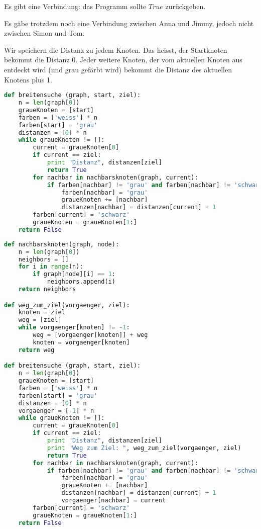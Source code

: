 \begin{lsg}
Es gibt eine Verbindung: das Programm sollte $True$ zur\"uckgeben.
\end{lsg}

\begin{lsg}
Es g\"abe trotzdem noch eine Verbindung zwischen Anna und Jimmy, jedoch nicht zwischen Simon und Tom.
\end{lsg}

\begin{lsg}
Wir speichern die Distanz zu jedem Knoten. Das heisst, der Startknoten bekommt die Distanz 0. Jeder weitere Knoten, der vom aktuellen Knoten aus entdeckt wird (und grau gef\"arbt wird) bekommt die Distanz des aktuellen Knotens plus 1.
\end{lsg}

\begin{lsg}
\hfill
\begin{lstlisting}[language=Python,basicstyle=\small,tabsize=3]
def breitensuche (graph, start, ziel):
	n = len(graph[0])
	graueKnoten = [start]
	farben = ['weiss'] * n
	farben[start] = 'grau'
	distanzen = [0] * n
	while graueKnoten != []:
		current = graueKnoten[0]
		if current == ziel:
			print "Distanz", distanzen[ziel]
			return True
		for nachbar in nachbarsknoten(graph, current):
			if farben[nachbar] != 'grau' and farben[nachbar] != 'schwarz':
				farben[nachbar] = 'grau'
				graueKnoten += [nachbar]
				distanzen[nachbar] = distanzen[current] + 1
		farben[current] = 'schwarz'
		graueKnoten = graueKnoten[1:]
	return False
\end{lstlisting}
\end{lsg}

\begin{lsg}
\hfill
\begin{lstlisting}[language=Python,basicstyle=\small,tabsize=3]
def nachbarsknoten(graph, node):
	n = len(graph[0])
	neighbors = []
	for i in range(n):
		if graph[node][i] == 1:
			neighbors.append(i)
	return neighbors

def weg_zum_ziel(vorgaenger, ziel):
	knoten = ziel
	weg = [ziel]	
	while vorgaenger[knoten] != -1:
		weg = [vorgaenger[knoten]] + weg
		knoten = vorgaenger[knoten]
	return weg

def breitensuche (graph, start, ziel):
	n = len(graph[0])
	graueKnoten = [start]
	farben = ['weiss'] * n
	farben[start] = 'grau'
	distanzen = [0] * n
	vorgaenger = [-1] * n
	while graueKnoten != []:
		current = graueKnoten[0]
		if current == ziel:
			print "Distanz", distanzen[ziel]
			print "Weg zum Ziel: ", weg_zum_ziel(vorgaenger, ziel)
			return True
		for nachbar in nachbarsknoten(graph, current):
			if farben[nachbar] != 'grau' and farben[nachbar] != 'schwarz':
				farben[nachbar] = 'grau'
				graueKnoten += [nachbar]
				distanzen[nachbar] = distanzen[current] + 1
				vorgaenger[nachbar] = current
		farben[current] = 'schwarz'
		graueKnoten = graueKnoten[1:]
	return False
\end{lstlisting}
\end{lsg}

